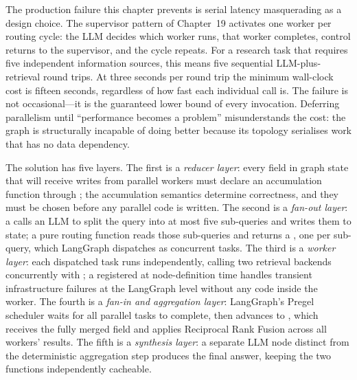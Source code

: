 

The production failure this chapter prevents is serial latency
masquerading as a design choice. The supervisor pattern of Chapter~19
activates one worker per routing cycle: the LLM decides which worker
runs, that worker completes, control returns to the supervisor, and the
cycle repeats. For a research task that requires five independent
information sources, this means five sequential LLM-plus-retrieval round
trips. At three seconds per round trip the minimum wall-clock cost is
fifteen seconds, regardless of how fast each individual call is. The
failure is not occasional---it is the guaranteed lower bound of every
invocation. Deferring parallelism until ``performance becomes a problem''
misunderstands the cost: the graph is structurally incapable of doing
better because its topology serialises work that has no data dependency.

The solution has five layers. The first is a \emph{reducer layer}: every
field in graph state that will receive writes from parallel workers must
declare an accumulation function through ; the
accumulation semantics determine correctness, and they must be chosen
before any parallel code is written. The second is a \emph{fan-out layer}:
a  calls an LLM to split the query into at most
five sub-queries and writes them to state; a pure routing function
 reads those sub-queries and returns a
, one per sub-query, which LangGraph dispatches as
concurrent tasks. The third is a \emph{worker layer}: each dispatched
 task runs independently, calling two retrieval
backends concurrently with ; a 
registered at node-definition time handles transient infrastructure
failures at the LangGraph level without any code inside the worker. The
fourth is a \emph{fan-in and aggregation layer}: LangGraph's Pregel
scheduler waits for all parallel tasks to complete, then advances to
, which receives the fully merged
 field and applies Reciprocal Rank Fusion across
all workers' results. The fifth is a \emph{synthesis layer}: a separate
LLM node distinct from the deterministic aggregation step produces the
final answer, keeping the two functions independently cacheable.

